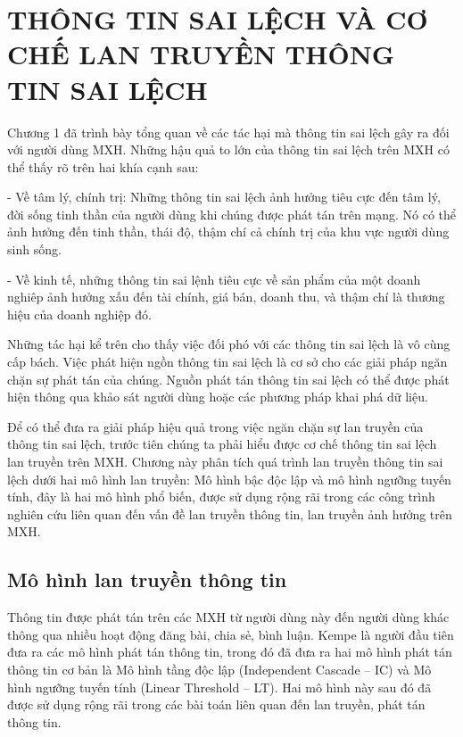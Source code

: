 \chapter{THÔNG TIN SAI LỆCH VÀ CƠ CHẾ LAN TRUYỀN THÔNG TIN SAI LỆCH}
\label{chap:2}
Chương 1 đã trình bày tổng quan về các tác hại mà thông tin sai lệch gây ra đối với người dùng MXH. Những hậu quả to lớn của thông tin sai lệch trên MXH có thể thấy rõ trên hai khía cạnh sau: 

- Về tâm lý, chính trị: Những thông tin sai lệch ảnh hưởng tiêu cực đến tâm lý, đời sống tinh thần của người dùng khi chúng được phát tán trên mạng. Nó có thể ảnh hưởng đến tinh thần, thái độ, thậm chí cả chính trị của khu vực người dùng sinh sống. 

- Về kinh tế, những thông tin sai lệnh tiêu cực về sản phẩm của một doanh nghiêp ảnh hưởng xấu đến tài chính, giá bán, doanh thu, và thậm chí là thương hiệu của doanh nghiệp đó. 

Những tác hại kể trên cho thấy việc đối phó với các thông tin sai lệch là vô cùng cấp bách. Việc phát hiện ngồn thông tin sai lệch là cơ sở cho các giải pháp ngăn chặn sự phát tán của chúng. Nguồn phát tán thông tin sai lệch có thể được phát hiện thông qua khảo sát người dùng hoặc các phương pháp khai phá dữ liệu.

Để có thể đưa ra giải pháp hiệu quả trong việc ngăn chặn sự lan truyền của thông tin sai lệch, trước tiên chúng ta phải hiểu được cơ chế thông tin sai lệch lan truyền trên MXH. Chương này phân tích quá trình lan truyền thông tin sai lệch dưới hai mô hình lan truyền: Mô hình bậc độc lập và mô hình ngưỡng tuyến tính, đây là hai mô hình phổ biến, được sử dụng rộng rãi trong các công trình nghiên cứu liên quan đến vấn đề lan truyền thông tin, lan truyền ảnh hưởng trên MXH.


\section{Mô hình lan truyền thông tin}
Thông tin được phát tán trên các MXH từ người dùng này đến người dùng khác thông qua nhiều hoạt động đăng bài, chia sẻ, bình luận. Kempe \cite{kemple1} là người đầu tiên đưa ra các mô hình phát tán thông tin, trong đó đã đưa ra hai mô hình phát tán thông tin cơ bản là Mô hình tầng độc lập (Independent Cascade – IC) và Mô hình ngưỡng tuyến tính (Linear Threshold – LT). Hai mô hình này sau đó đã được sử dụng rộng rãi trong các bài toán liên quan đến lan truyền, phát tán thông tin.


